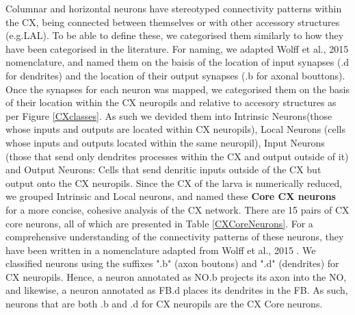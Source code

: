     Columnar and horizontal neurons have stereotyped connectivity patterns within the CX, being connected between themselves or with other accessory structures (e.g.LAL). To be able to define these, we categorised them similarly to how they have been categorised in the literature. For naming, we adapted Wolff et al., 2015 nomenclature, and named them on the baisis of the location of input synapses (.d for dendrites) and the location of their output synapses (.b for axonal bouttons). Once the synapses for each neuron was mapped, we categorised them on the basis of their location within the CX neuropils and relative to accesory structures as per Figure \ref{CXclasses}.  As such we devided them into Intrinsic Neurons(those whose inputs and outputs are located within CX neuropils), Local Neurons (cells whose inputs and outputs located within the same neuropil), Input Neurons (those that send only dendrites processes within the CX and output outside of it) and Output Neurons: Cells that send denritic inputs outside of the CX but output onto the CX neuropils. Since the CX of the larva is numerically reduced, we grouped Intrinsic and Local neurons, and named these \textbf{Core CX neurons} for a more concise, cohesive analysis of the CX network. There are 15 pairs of CX core neurons, all of which are presented in Table \ref{CXCoreNeurons}. For a comprehensive understanding of the connectivity patterns of these neurons, they have been written in a nomenclature adapted from Wolff et al., 2015 \citep{wolff2015neuroarchitecture}. We classified neurons using the suffixes ".b" (axon boutons) and ".d" (dendrites) for CX neuropils.
    Hence, a neuron annotated as NO.b projects its axon into the NO, and likewise, a neuron annotated as FB.d places its dendrites in the FB.
    As such, neurons that are both .b and .d for CX neuropils are the CX Core neurons. 



